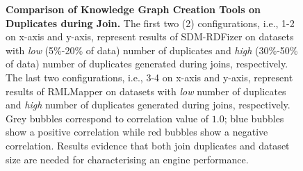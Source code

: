 \begin{figure}[!tb]
    \caption[Knowledge Graph Creation Tools on Duplicates during Join]{\textbf{Comparison of Knowledge Graph Creation Tools on Duplicates during Join.} The first two (2) configurations, i.e., 1-2 on x-axis and y-axis, represent results of SDM-RDFizer on datasets with \textit{low} (5\%-20\% of data) number of duplicates and \textit{high} (30\%-50\% of data) number of duplicates generated during joins, respectively. The last two configurations, i.e., 3-4 on x-axis and y-axis, represent results of RMLMapper on datasets with \textit{low} number of duplicates and \textit{high} number of duplicates generated during joins, respectively. Grey bubbles correspond to correlation value of $1.0$; blue bubbles show a positive correlation while red bubbles show a negative correlation. Results evidence that both join duplicates and dataset size are needed for characterising an engine performance.}
    \label{fig:duplicates_bubble}
\end{figure}



